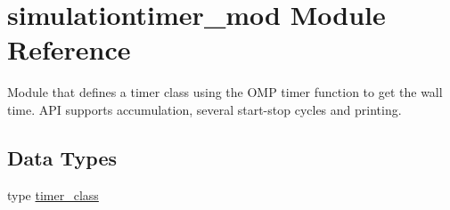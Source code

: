 \hypertarget{namespacesimulationtimer__mod}{}\section{simulationtimer\+\_\+mod Module Reference}
\label{namespacesimulationtimer__mod}


Module that defines a timer class using the O\+MP timer function to get the wall time. A\+PI supports accumulation, several start-\/stop cycles and printing.  


\subsection*{Data Types}
\begin{DoxyCompactItemize}
\item 
type \mbox{\hyperlink{structsimulationtimer__mod_1_1timer__class}{timer\+\_\+class}}
\end{DoxyCompactItemize}
